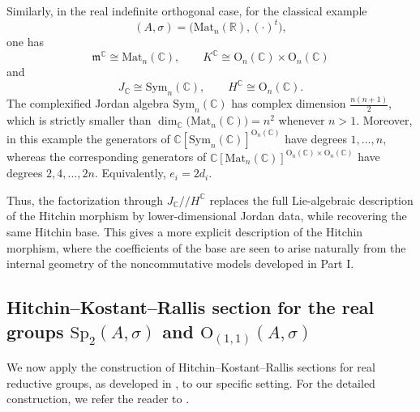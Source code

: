\documentclass[oneside,11pt]{amsart}
\theoremstyle{definition}
\theoremstyle{remark}
\numberwithin{thm}{section}
\numberwithin{equation}{section}
\begin{document}
Similarly, in the real indefinite orthogonal case, for the classical example
\[
(A,\sigma)=\bigl(\mathrm{Mat}_n(\mathbb R),(\cdot)^t\bigr),
\]
one has
\[
\mathfrak{m}^{\mathbb C}\cong \mathrm{Mat}_n(\mathbb C),\qquad K^{\mathbb{C}}\cong\mathrm{O}_n(\mathbb{C})\times\mathrm{O}_n(\mathbb{C})
\]
and 
\[
J_{\mathbb{C}}\cong \mathrm{Sym}_n(\mathbb{C}), \qquad H^{\mathbb C}\cong \mathrm{O}_n(\mathbb{C}).
\]
The complexified Jordan algebra $\mathrm{Sym}_n(\mathbb{C})$ has complex dimension $\frac{n(n+1)}{2}$, which is strictly smaller than $\dim_{\mathbb{C}}\bigl(\mathrm{Mat}_n(\mathbb C)\bigr)=n^2$ whenever $n>1$. Moreover, in this example the generators of $\mathbb{C}[\mathrm{Sym}_n(\mathbb{C})]^{\mathrm{O}_n(\mathbb{C})}$ have degrees $1,\dots,n$, whereas the corresponding generators of $\mathbb{C} [\mathrm{Mat}_n(\mathbb C)]^{\mathrm{O}_n(\mathbb{C})\times\mathrm{O}_n(\mathbb{C})}$ have degrees $2,4,\dots,2n$. Equivalently, $e_i=2d_i$.

Thus, the factorization through $J_{\mathbb{C}}/\!\!/H^{\mathbb{C}}$ replaces the full Lie-algebraic description of the Hitchin morphism by lower-dimensional Jordan data, while recovering the same Hitchin base. This gives a more explicit description of the Hitchin morphism, where the coefficients of the base are seen to arise naturally from the internal geometry of the noncommutative models developed in Part I.

\subsection{Hitchin--Kostant--Rallis section for the real groups \texorpdfstring{$\mathrm{Sp}_2(A,\sigma)$ and $\mathrm{O}_{(1,1)}(A,\sigma)$}{}}\label{Hi_Ko_Ra_sec}


We now apply the construction of Hitchin--Kostant--Rallis sections for real reductive groups, as developed in \cite{GPR}, to our specific setting. For the detailed construction, we refer the reader to \cite{GPR}.
\end{document}
